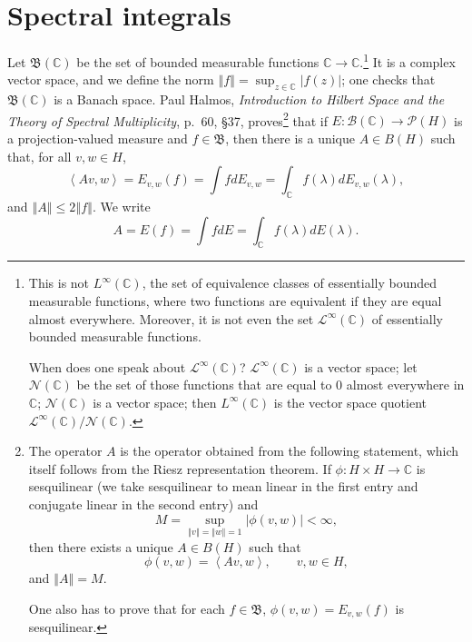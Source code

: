 \documentclass{article}
\newcommand{\inner}[2]{\left\langle #1, #2 \right\rangle}
\newcommand{\norm}[1]{\left\Vert #1 \right\Vert}
\begin{document}
\section{Spectral integrals}
Let $\mathfrak{B}(\mathbb{C})$ be the set of bounded measurable functions $\mathbb{C} \to \mathbb{C}$.\footnote{This is not
$L^\infty(\mathbb{C})$, the set of equivalence classes of essentially bounded measurable functions, where two functions
are equivalent if they are equal almost everywhere. Moreover, it is not even the set $\mathscr{L}^\infty(\mathbb{C})$ of
essentially bounded measurable functions.

When does one speak about $\mathscr{L}^\infty(\mathbb{C})$? $\mathscr{L}^\infty(\mathbb{C})$ is a vector space; let $\mathscr{N}(\mathbb{C})$
be the set of those functions that are equal to $0$ almost everywhere in $\mathbb{C}$; $\mathscr{N}(\mathbb{C})$ is a vector space; then $L^\infty(\mathbb{C})$ is the vector space quotient
$\mathscr{L}^\infty(\mathbb{C})/\mathscr{N}(\mathbb{C})$.} It is a complex vector space, and we define the norm
$\norm{f}=\sup_{z \in \mathbb{C}} |f(z)|$; one checks that $\mathfrak{B}(\mathbb{C})$ is a Banach space.
Paul Halmos, {\em Introduction to Hilbert Space and the Theory of Spectral Multiplicity},
p.~60, \S 37, proves\footnote{The operator $A$ is the operator obtained from the following statement, which
  itself follows
from the Riesz representation theorem.
If $\phi:H \times H \to \mathbb{C}$ is sesquilinear (we take sesquilinear to mean linear in the first entry and conjugate
linear in the second entry) and 
\[
M=\sup_{\norm{v}=\norm{w}=1} |\phi(v,w)|<\infty,
\]
then there exists a unique $A \in B(H)$ such that
\[
\phi(v,w)=\inner{Av}{w}, \qquad v, w \in H,
\]
and $\norm{A}=M$.

One also has to prove that for each $f \in \mathfrak{B}$, $\phi(v,w)=E_{v,w}(f)$ is sesquilinear.} that if $E:\mathscr{B}(\mathbb{C}) \to \mathscr{P}(H)$ is a projection-valued measure
and $f \in \mathfrak{B}$, then there is a unique $A \in B(H)$ such that, for all $v, w \in H$,
\[
\inner{Av}{w}=E_{v,w}(f)=\int f dE_{v,w}=\int_\mathbb{C} f(\lambda) dE_{v,w}(\lambda),
\]
and $\norm{A} \leq 2\norm{f}$. 
We write
\[
A=E(f)=\int f dE=\int_\mathbb{C} f(\lambda) dE(\lambda).
\]
\end{document}
